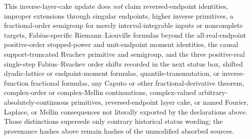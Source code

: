 \documentclass[11pt,oneside]{article}
\theoremstyle{definition}
\theoremstyle{remark}
\newcommand{\1}{\mathbf 1}
\begin{document}
\begin{statusbox}
This inverse-layer-cake update does \emph{not} claim reversed-endpoint identities,
improper extensions through singular endpoints, higher inverse primitives, a
fractional-order semigroup for merely interval-integrable inputs or noncomplete targets,
Fabius-specific Riemann--Liouville formulas beyond the all-real-endpoint positive-order
stopped-power and unit-endpoint moment identities, the causal support-truncated Rvachev
primitive and semigroup, and the three positive-real single-step Fabius--Rvachev order
shifts recorded in the next status box, shifted dyadic-lattice or endpoint-moment formulas,
quantile-transmutation, or inverse-function fractional formulas, any Caputo
or other fractional-derivative theorem, complex-order or complex-Mellin continuations,
complex-valued arbitrary-absolutely-continuous primitives, reversed-endpoint layer cake,
or named Fourier, Laplace, or Mellin consequences not literally exported by the
declarations above.  Those
distinctions supersede only contrary historical status wording; the provenance hashes
above remain hashes of the unmodified absorbed sources.
\end{statusbox}
\end{document}
